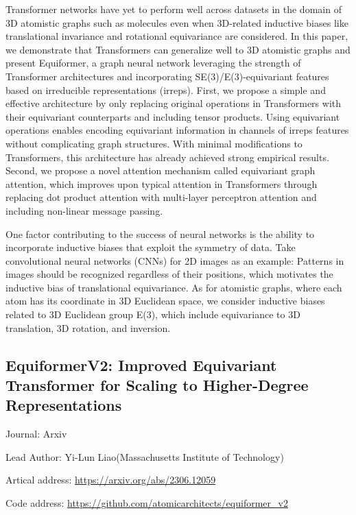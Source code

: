 \documentclass[11pt]{elegantbook}
\begin{document}
Transformer networks have yet to perform well across datasets in the domain of 3D atomistic graphs such as molecules even when 3D-related inductive biases like translational invariance and rotational equivariance are considered. In this paper, we demonstrate that Transformers can generalize well to 3D atomistic graphs and present Equiformer, a graph neural network leveraging the strength of Transformer architectures and incorporating SE(3)/E(3)-equivariant features based on irreducible representations (irreps). 
First, we propose a simple and effective architecture by only replacing original operations in Transformers with their equivariant counterparts and including tensor products. Using equivariant operations enables encoding equivariant information in channels of irreps features without complicating graph structures. With minimal modifications to Transformers, this architecture has already achieved strong empirical results. Second, we propose a novel attention mechanism called equivariant graph attention, which improves upon typical attention in Transformers through replacing dot product attention with multi-layer perceptron attention and including non-linear message passing.

One factor contributing to the success of neural networks is the ability to incorporate inductive biases that exploit the symmetry of data. Take convolutional neural networks (CNNs) for 2D images as an example: Patterns in images should be recognized regardless of their positions, which motivates the inductive bias of translational equivariance. As for atomistic graphs, where each atom has its coordinate in 3D Euclidean space, we consider inductive biases related to 3D Euclidean group E(3), which include equivariance to 3D translation, 3D rotation, and inversion. 


\subsection{EquiformerV2: Improved Equivariant Transformer for Scaling to Higher-Degree Representations}
\begin{brief}
    \item Journal: Arxiv
    \item Lead Author: Yi-Lun Liao(Massachusetts Institute of Technology)
    \item Artical address: \href{https://arxiv.org/abs/2306.12059}{https://arxiv.org/abs/2306.12059}
    \item Code address: \href{https://github.com/atomicarchitects/equiformer\_v2}{https://github.com/atomicarchitects/equiformer\_v2}
\end{brief}
\end{document}
